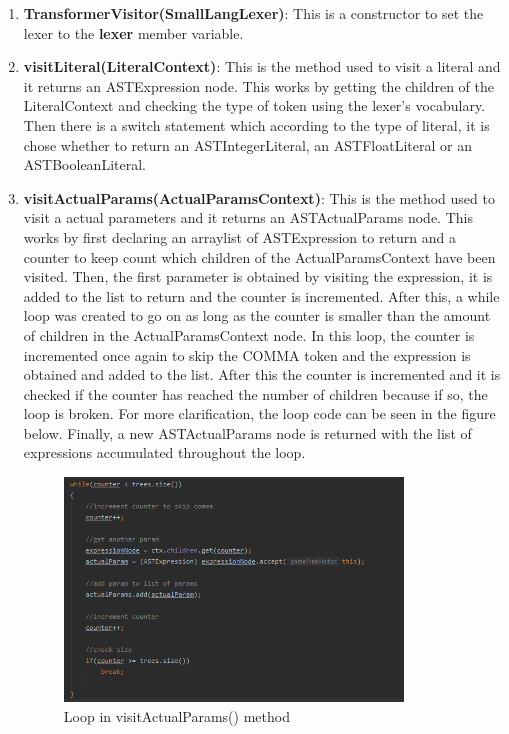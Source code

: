 \documentclass{article}
\begin{document}
				\begin{enumerate}
				\item \textbf{TransformerVisitor(SmallLangLexer)}: This is a constructor to set the lexer to the \textbf{lexer} member variable.
				
				\item \textbf{visitLiteral(LiteralContext)}: This is the method used to visit a literal and it returns an ASTExpression node. This works by getting the children of the LiteralContext and checking the type of token using the lexer's vocabulary. Then there is a switch statement which according to the type of literal, it is chose whether to return an ASTIntegerLiteral, an ASTFloatLiteral or an ASTBooleanLiteral.
				
				\item \textbf{visitActualParams(ActualParamsContext)}: This is the method used to visit a actual parameters and it returns an ASTActualParams node. This works by first declaring an arraylist of ASTExpression to return and a counter to keep count which children of the ActualParamsContext have been visited. Then, the first parameter is obtained by visiting the expression, it is added to the list to return and the counter is incremented. After this, a while loop was created to go on as long as the counter is smaller than the amount of children in the ActualParamsContext node. In this loop, the counter is incremented once again to skip the COMMA token and the expression is obtained and added to the list. After this the counter is incremented and it is checked if the counter has reached the number of children because if so, the loop is broken. For more clarification, the loop code can be seen in the figure below. Finally, a new ASTActualParams node is returned with the list of expressions accumulated throughout the loop.
				
				
						\begin{figure}[H]
					\centering
			 			\includegraphics[width=0.85\textwidth]{transformerap.png}
			  			\caption{Loop in visitActualParams() method}
			  			\label{fig:transformerap}
					\end{figure}
					

\end{enumerate}
\end{document}
